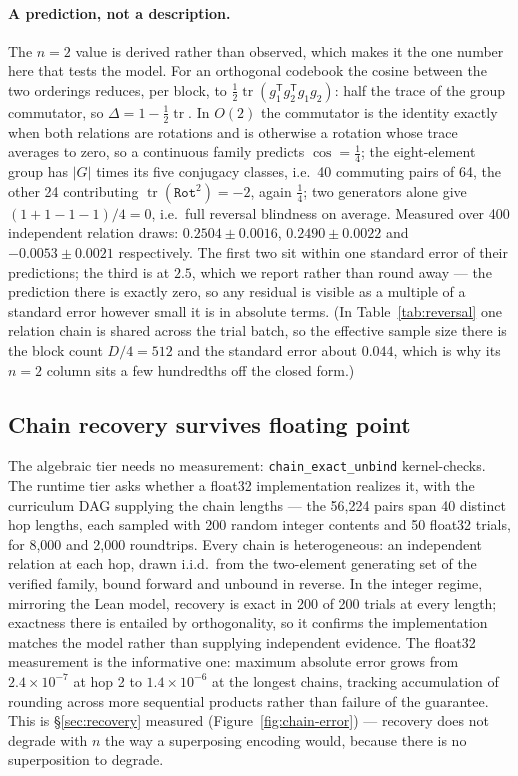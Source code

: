 \documentclass[10pt]{article}
\begin{document}
\paragraph{A prediction, not a description.} The $n = 2$ value is derived rather than observed, which makes it the one number here that tests the model. For an orthogonal codebook the cosine between the two orderings reduces, per block, to $\tfrac{1}{2}\operatorname{tr}(g_1^{\mathsf{T}} g_2^{\mathsf{T}} g_1 g_2)$: half the trace of the group commutator, so $\Delta = 1 - \tfrac{1}{2}\operatorname{tr}$. In $O(2)$ the commutator is the identity exactly when both relations are rotations and is otherwise a rotation whose trace averages to zero, so a continuous family predicts $\cos = \tfrac14$; the eight-element group has $|G|$ times its five conjugacy classes, i.e.\ 40 commuting pairs of 64, the other 24 contributing $\operatorname{tr}(\texttt{Rot}^2) = -2$, again $\tfrac14$; two generators alone give $(1 + 1 - 1 - 1)/4 = 0$, i.e.\ full reversal blindness on average. Measured over 400 independent relation draws: $0.2504 \pm 0.0016$, $0.2490 \pm 0.0022$ and $-0.0053 \pm 0.0021$ respectively. The first two sit within one standard error of their predictions; the third is at $2.5$, which we report rather than round away --- the prediction there is exactly zero, so any residual is visible as a multiple of a standard error however small it is in absolute terms. (In Table~\ref{tab:reversal} one relation chain is shared across the trial batch, so the effective sample size there is the block count $D/4 = 512$ and the standard error about $0.044$, which is why its $n = 2$ column sits a few hundredths off the closed form.)

\subsection{Chain recovery survives floating point}
\label{sec:runtime}

The algebraic tier needs no measurement: \texttt{chain\_exact\_unbind} kernel-checks. The runtime tier asks whether a float32 implementation realizes it, with the curriculum DAG supplying the chain lengths --- the 56{,}224 pairs span 40 distinct hop lengths, each sampled with 200 random integer contents and 50 float32 trials, for 8{,}000 and 2{,}000 roundtrips. Every chain is heterogeneous: an independent relation at each hop, drawn i.i.d.\ from the two-element generating set of the verified family, bound forward and unbound in reverse. In the integer regime, mirroring the Lean model, recovery is exact in 200 of 200 trials at every length; exactness there is entailed by orthogonality, so it confirms the implementation matches the model rather than supplying independent evidence. The float32 measurement is the informative one: maximum absolute error grows from $2.4\times10^{-7}$ at hop 2 to $1.4\times10^{-6}$ at the longest chains, tracking accumulation of rounding across more sequential products rather than failure of the guarantee. This is \S\ref{sec:recovery} measured (Figure~\ref{fig:chain-error}) --- recovery does not degrade with $n$ the way a superposing encoding would, because there is no superposition to degrade.
\end{document}
